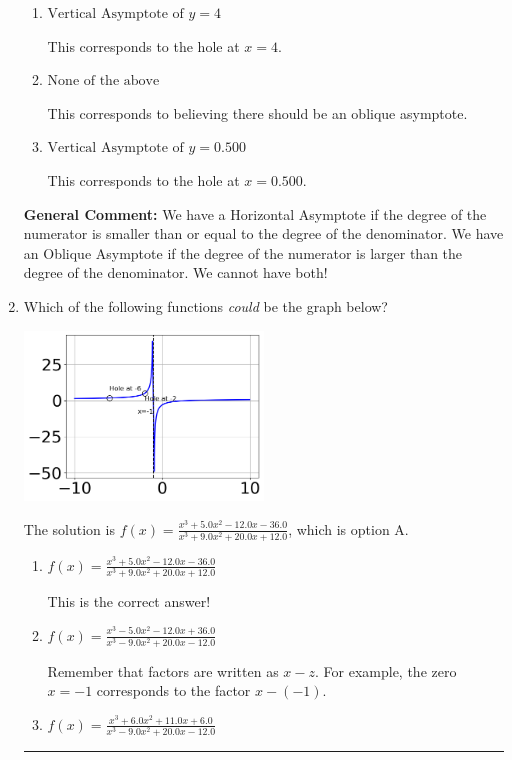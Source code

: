 \documentclass{extbook}[14pt]
\newcommand{\litem}[1]{\item #1

\rule{\textwidth}{0.4pt}}
\begin{document}
\begin{enumerate}
{\begin{enumerate}[label=\Alph*.]
* This is the correct option.
\item \( \text{Vertical Asymptote of } y = 4  \)

This corresponds to the hole at $x = 4$.
\item \( \text{None of the above} \)

This corresponds to believing there should be an oblique asymptote.
\item \( \text{Vertical Asymptote of } y = 0.500  \)

This corresponds to the hole at $x = 0.500$.
\end{enumerate}

\textbf{General Comment:} We have a Horizontal Asymptote if the degree of the numerator is smaller than or equal to the degree of the denominator. We have an Oblique Asymptote if the degree of the numerator is larger than the degree of the denominator. We cannot have both!
}
\litem{
Which of the following functions \textit{could} be the graph below?

\begin{center}
    \includegraphics[width=0.5\textwidth]{../Figures/identifyGraphOfRationalFunctionC.png}
\end{center}


The solution is \( f(x)=\frac{x^{3} +5.0 x^{2} -12.0 x -36.0}{x^{3} +9.0 x^{2} +20.0 x + 12.0} \), which is option A.\begin{enumerate}[label=\Alph*.]
\item \( f(x)=\frac{x^{3} +5.0 x^{2} -12.0 x -36.0}{x^{3} +9.0 x^{2} +20.0 x + 12.0} \)

This is the correct answer!
\item \( f(x)=\frac{x^{3} -5.0 x^{2} -12.0 x + 36.0}{x^{3} -9.0 x^{2} +20.0 x -12.0} \)

Remember that factors are written as $x-z$. For example, the zero $x=-1$ corresponds to the factor $x-(-1)$.
\item \( f(x)=\frac{x^{3} +6.0 x^{2} +11.0 x + 6.0}{x^{3} -9.0 x^{2} +20.0 x -12.0} \)


\end{enumerate}}
\end{enumerate}
\end{document}

